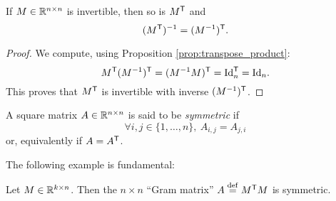 \documentclass[11pt,nocut]{article}
\begin{document}
\begin{corollary}
	If $M \in \mathbb{R}^{n \times n}$ is invertible, then so is $M^{{\sf T}}$ and
	$$
	(M^{{\sf T}})^{-1} = (M^{-1})^{{\sf T}}.
	$$
\end{corollary}
\begin{proof}
	We compute, using Proposition \ref{prop:transpose_product}:
	$$
	M^{{\sf T}} (M^{-1})^{{\sf T}} = (M^{-1} M)^{{\sf T}} = {{\rm Id}}_n^{{\sf T}} = {{\rm Id}}_n.
	$$
	This proves that $M^{{\sf T}}$ is invertible with inverse $(M^{-1})^{{\sf T}}$.
\end{proof}


\begin{definition}
	A square matrix $A \in \mathbb{R}^{n \times n}$ is said to be \emph{symmetric} if
	$$
	\forall i,j \in \{1, \dots, n\}, \ A_{i,j} = A_{j,i}
	$$
	or, equivalently if $A = A^{{\sf T}}$.
\end{definition}

The following example is fundamental:
\begin{example}
	Let $M \in \mathbb{R}^{k \times n}$. Then the $n\times n$ ``Gram matrix'' $A \overset{\rm def}{=} M^{{\sf T}} M$ is symmetric.
\end{example}

	\vspace{1cm}
	\centerline{}

%
%
\end{document}

